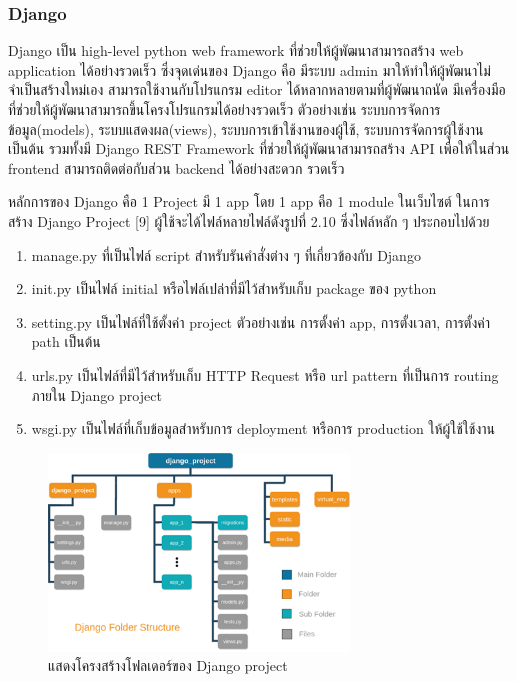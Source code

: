 \documentclass[12pt,oneside,openright,a4paper]{cpe-thai-project}
\begin{document}
\subsubsection{Django}
\par\setlength{\parindent}{5ex}
Django เป็น high-level python web framework ที่ช่วยให้ผู้พัฒนาสามารถสร้าง web application ได้อย่างรวดเร็ว ซึ่งจุดเด่นของ Django คือ มีระบบ admin มาให้ทำให้ผู้พัฒนาไม่จำเป็นสร้างใหม่เอง สามารถใช้งานกับโปรแกรม editor ได้หลากหลายตามที่ผู้พัฒนาถนัด มีเครื่องมือที่ช่วยให้ผู้พัฒนาสามารถขึ้นโครงโปรแกรมได้อย่างรวดเร็ว ตัวอย่างเช่น ระบบการจัดการข้อมูล(models), ระบบแสดงผล(views), ระบบการเข้าใช้งานของผู้ใช้, ระบบการจัดการผู้ใช้งาน เป็นต้น รวมทั้งมี Django REST Framework ที่ช่วยให้ผู้พัฒนาสามารถสร้าง API เพื่อให้ในส่วน frontend สามารถติดต่อกับส่วน backend ได้อย่างสะดวก รวดเร็ว

\par\setlength{\parindent}{5ex}
หลักการของ Django คือ 1 Project มี 1 app โดย 1 app คือ 1 module ในเว็บไซต์ ในการสร้าง Django Project [9] ผู้ใช้จะได้ไฟล์หลายไฟล์ดังรูปที่ 2.10 ซึ่งไฟล์หลัก ๆ ประกอบไปด้วย
\begin{enumerate}
  \item manage.py ที่เป็นไฟล์ script สำหรับรันคำสั่งต่าง ๆ ที่เกี่ยวข้องกับ Django
  \item \textunderscore init\textunderscore.py เป็นไฟล์ initial หรือไฟล์เปล่าที่มีไว้สำหรับเก็บ package ของ python
  \item setting.py เป็นไฟล์ที่ใช้ตั้งค่า project ตัวอย่างเช่น การตั้งค่า app, การตั้งเวลา, การตั้งค่า path เป็นต้น
  \item urls.py เป็นไฟล์ที่มีไว้สำหรับเก็บ HTTP Request หรือ url pattern ที่เป็นการ routing ภายใน Django project
  \item wsgi.py เป็นไฟล์ที่เก็บข้อมูลสำหรับการ deployment หรือการ production ให้ผู้ใช้ใช้งาน
\end{enumerate}



\begin{figure}[!h]
  \centering
  \includegraphics[width=8cm]{./image/django.png}
  \caption{แสดงโครงสร้างโฟลเดอร์ของ Django project}
  \label{fig:django}
\end{figure}
\end{document}
